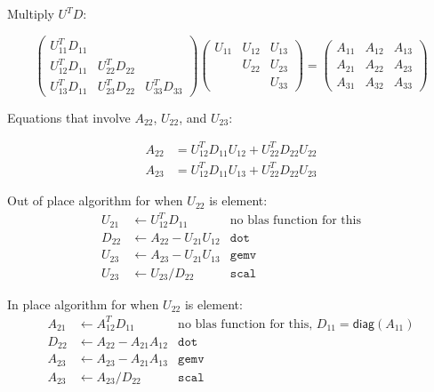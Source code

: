 \documentclass[12pt]{article}
\begin{document}
Multiply $U^TD$:

\begin{equation*}
\begin{pmatrix}
U_{11}^TD_{11} &               &              \\
U_{12}^TD_{11} & U_{22}^TD_{22} &              \\
U_{13}^TD_{11} & U_{23}^TD_{22} & U_{33}^TD_{33}
\end{pmatrix}
\begin{pmatrix}
U_{11} & U_{12} & U_{13} \\
       & U_{22} & U_{23} \\
       &        & U_{33}
\end{pmatrix}
= 
\begin{pmatrix}
A_{11} & A_{12} & A_{13} \\
A_{21} & A_{22} & A_{23} \\
A_{31} & A_{32} & A_{33}
\end{pmatrix}
\end{equation*}

Equations that involve $A_{22}$, $U_{22}$, and $U_{23}$:

\begin{align*}
A_{22} &= U_{12}^TD_{11}U_{12} + U_{22}^TD_{22}U_{22} \\
A_{23} &= U_{12}^TD_{11}U_{13} + U_{22}^TD_{22}U_{23}
\end{align*}

Out of place algorithm for when $U_{22}$ is element:
\begin{align*}
U_{21} & \gets U_{12}^TD_{11}        & \text{no blas function for this} \\
D_{22} & \gets A_{22} - U_{21}U_{12} & \texttt{dot} \\
U_{23} & \gets A_{23} - U_{21}U_{13} & \texttt{gemv} \\
U_{23} & \gets U_{23} / D_{22}       & \texttt{scal}
\end{align*}

In place algorithm for when $U_{22}$ is element:
\begin{align*}
A_{21} & \gets A_{12}^TD_{11}        & \text{no blas function for this, $D_{11}=\mathsf{diag}(A_{11})$} \\
D_{22} & \gets A_{22} - A_{21}A_{12} & \texttt{dot} \\
A_{23} & \gets A_{23} - A_{21}A_{13} & \texttt{gemv} \\
A_{23} & \gets A_{23} / D_{22}       & \texttt{scal}
\end{align*}
\end{document}
